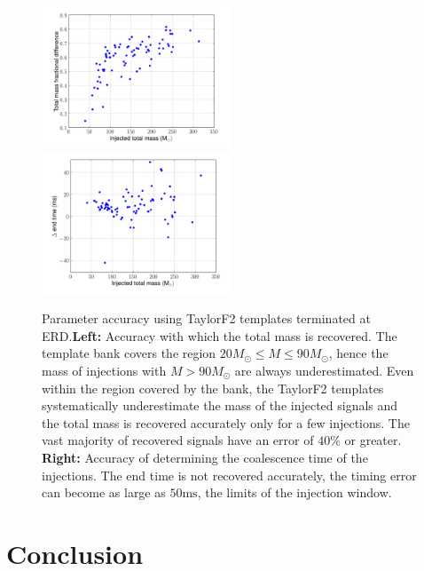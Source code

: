 \begin{figure}
    \includegraphics[width=0.50\textwidth]{figures/ninja1/spa_erd_3_5pn_mass_estimate}
    \includegraphics[width=0.50\textwidth]{figures/ninja1/spa_erd_3_5pn_time_estimate_vs_mt}
\caption[Parameter accuracy using TaylorF2 templates terminated at ERD]{
\label{fig:3_5pn_params}
Parameter accuracy using TaylorF2 templates terminated at
ERD.\textbf{Left:} Accuracy with which the total mass is recovered. The
template bank covers the region $20 M_\odot \le M \le 90 M_\odot$, hence
the mass of injections with $M > 90 M_\odot$ are always underestimated.
Even within the region covered by the bank, the TaylorF2 templates
systematically underestimate the mass of the injected signals and the total
mass is recovered accurately only for a few injections.  The vast majority of
recovered signals have an error of $40\%$ or greater. \textbf{Right:} Accuracy
of determining the coalescence time of the injections.  The end time is not
recovered accurately, the timing error can become as large as $50
\mathrm{ms}$, the limits of the injection window.  }
\end{figure}



\section{Conclusion}
%







